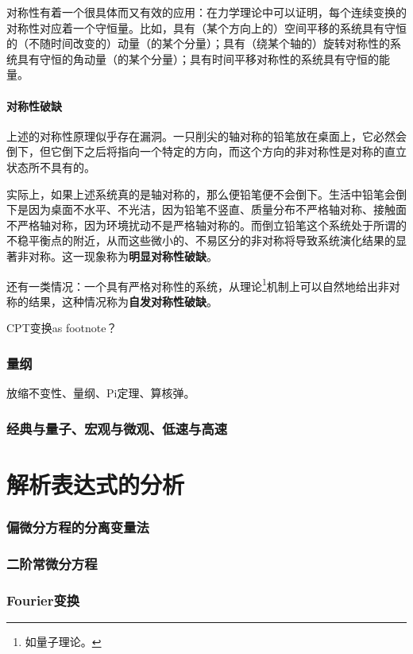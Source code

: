 \documentclass[10pt]{article}
\begin{document}
				对称性有着一个很具体而又有效的应用：在力学理论中可以证明，每个连续变换的对称性对应着一个守恒量。比如，具有（某个方向上的）空间平移的系统具有守恒的（不随时间改变的）动量（的某个分量）；具有（绕某个轴的）旋转对称性的系统具有守恒的角动量（的某个分量）；具有时间平移对称性的系统具有守恒的能量。

			\subsection{对称性破缺}
				上述的对称性原理似乎存在漏洞。一只削尖的轴对称的铅笔放在桌面上，它必然会倒下，但它倒下之后将指向一个特定的方向，而这个方向的非对称性是对称的直立状态所不具有的。

				实际上，如果上述系统真的是轴对称的，那么便铅笔便不会倒下。生活中铅笔会倒下是因为桌面不水平、不光洁，因为铅笔不竖直、质量分布不严格轴对称、接触面不严格轴对称，因为环境扰动不是严格轴对称的。而倒立铅笔这个系统处于所谓的不稳平衡点的附近，从而这些微小的、不易区分的非对称将导致系统演化结果的显著非对称。这一现象称为\textbf{明显对称性破缺}。

				还有一类情况：一个具有严格对称性的系统，从理论\footnote{如量子理论。}机制上可以自然地给出非对称的结果，这种情况称为\textbf{自发对称性破缺}。

				CPT变换as footnote？

		\section{量纲}
			放缩不变性、量纲、Pi定理、算核弹。


		\section{经典与量子、宏观与微观、低速与高速}

	\part{解析表达式的分析}
		\section{偏微分方程的分离变量法}
		\section{二阶常微分方程}
		\section{Fourier变换}
\end{document}

